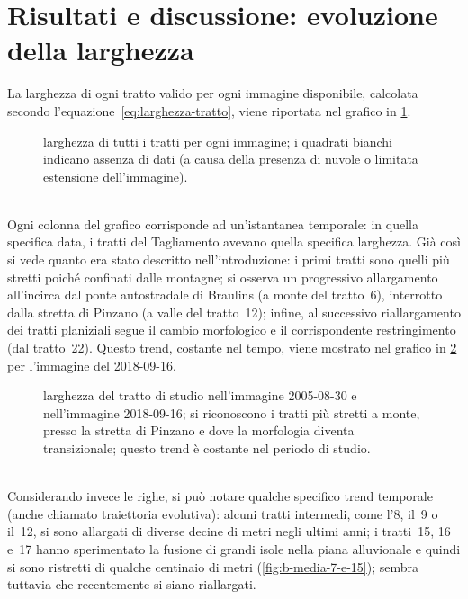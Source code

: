 \section{Risultati e discussione: evoluzione della larghezza}
La larghezza di ogni tratto valido per ogni immagine disponibile, calcolata secondo l'equazione~\eqref{eq:larghezza-tratto}, viene riportata nel grafico in \cref{graph:larghezze-tutti-tratti}.
%
\begin{figure}
	\centering
	
	\caption[larghezza di tutti i tratti per ogni immagine]{larghezza di tutti i tratti per ogni immagine; i quadrati bianchi indicano assenza di dati (a causa della presenza di nuvole o limitata estensione dell'immagine).}
	\label{graph:larghezze-tutti-tratti}
\end{figure}
%
\\
Ogni colonna del grafico corrisponde ad un'istantanea temporale: in quella specifica data, i tratti del Tagliamento avevano quella specifica larghezza.
Già così si vede quanto era stato descritto nell'introduzione:
i primi tratti sono quelli più stretti poiché confinati dalle montagne;
si osserva un progressivo allargamento all'incirca dal ponte autostradale di Braulins (a monte del tratto~6), interrotto dalla stretta di Pinzano (a valle del tratto~12);
infine, al successivo riallargamento dei tratti planiziali segue il cambio morfologico e il corrispondente restringimento (dal tratto~22).
Questo trend, costante nel tempo, viene mostrato nel grafico in \cref{graph:larghezza-2005-2018-09} per l'immagine \Se{} del 2018-09-16.
%
\begin{figure}
	\centering
	
	\caption[larghezza del tratto di studio nel 2005-08-30 e nel 2018-09-16]{larghezza del tratto di studio nell'immagine \AST{} 2005-08-30 e nell'immagine \Se{} 2018-09-16; si riconoscono i tratti più stretti a monte, presso la stretta di Pinzano e dove la morfologia diventa transizionale; questo trend è costante nel periodo di studio.}
	\label{graph:larghezza-2005-2018-09}
\end{figure}
%
\\
Considerando invece le righe, si può notare qualche specifico trend temporale (anche chiamato traiettoria evolutiva):
alcuni tratti intermedi, come l'8, il~9 o il~12, si sono allargati di diverse decine di metri negli ultimi anni;
i tratti~15, 16 e~17 hanno sperimentato la fusione di grandi isole nella piana alluvionale e quindi si sono ristretti di qualche centinaio di metri (\cref{fig:b-media-7-e-15}); sembra tuttavia che recentemente si siano riallargati.

